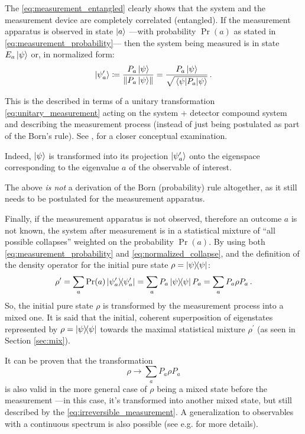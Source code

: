 The \eqref{eq:measurement_entangled} clearly shows that the system
and the measurement device are completely correlated (entangled).
If the measurement apparatus is observed in state $\ket{a}$
---with probability $\Pr(a)$ as stated in \eqref{eq:measurement_probability}---
then the system being measured is in state $E_{a}\ket{\psi}$
or, in normalized form:
\begin{equation}\label{eq:normalized_collapse}
  \ket{\psi^\prime_a} \coloneqq \frac{P_{a}\ket{\psi}}{\norm{P_{a}\ket{\psi}}}
    = \frac{P_{a}\ket{\psi}}{\sqrt{\expval{P_a}{\psi}}} \,\text{.}
\end{equation}

This is the  described in terms of a unitary
transformation \eqref{eq:unitary_measurement}
acting on the system + detector compound system and describing
the measurement process
(instead of just being postulated as part of the Born's rule).
See \cite[sec.2.5.4, \emph{Decoherence models versus Copenhagen interpretation}]{Haroche_Exploring},
for a closer conceptual examination.

Indeed,
$\ket{\psi}$
is transformed
into its projection $\ket{\psi^\prime_a}$
onto the eigenspace
corresponding to the eigenvalue $a$ of the observable of interest.

The above \emph{is not} a derivation of the Born (probability) rule altogether,
as it still needs to be postulated for the measurement apparatus.

Finally, if the measurement apparatus is not observed,
therefore an outcome $a$ is not known,
the system after measurement is in a statistical mixture
of ``all possible collapses'' weighted on the probability $\Pr(a)$.
By using both \eqref{eq:measurement_probability} and \eqref{eq:normalized_collapse},
and the definition of the density operator for the initial pure state
$\rho = \ketbra{\psi}$:
\[
  \rho^{\prime} = \sum_a \Pr(a) \ketbra{\psi^{\prime}_a} = \sum_a P_a \ketbra{\psi} P_a
    = \sum_a P_a \rho P_a \,\text{.}
\]
So, the initial pure state $\rho$ is transformed by the measurement process into a mixed one.
It is said that the initial, coherent superposition of eigenstates represented by $\rho = \ketbra{\psi}$
 towards the maximal statistical mixture $\rho^{\prime}$
(as seen in Section \ref{sec:mix}).

It can be proven that the transformation
\begin{equation}\label{eq:irreversible_measurement}
  \rho \rightarrow \sum_a P_a \rho P_a
\end{equation}
is also valid in the more general case of $\rho$ being a mixed state before the measurement
---in this case, it's transformed into another mixed state,
but still described by the \eqref{eq:irreversible_measurement}.
A generalization to observables with a continuous spectrum is also possible
(see e.g. \cite[Section 3.1.1]{PreskillNotes} for more details).


